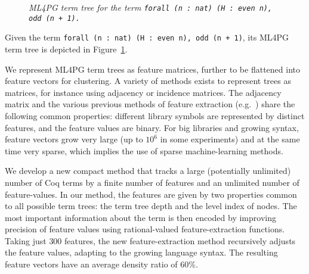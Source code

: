 \begin{figure}[t]
\centering
{}
\caption{\scriptsize{\emph{ML4PG term tree for the term \texttt{forall (n : nat) (H : even n), odd (n + 1).}}}}\label{fig:termtree}
\end{figure}

\begin{example}\label{ex1}
 Given the term \lstinline?forall (n : nat) (H : even n), odd (n + 1)?, its ML4PG term tree is depicted in Figure~\ref{fig:termtree}.
 \end{example}

We represent ML4PG term trees as feature matrices, further to be flattened into feature vectors for clustering.
A variety of methods exists to represent trees as matrices, for instance using
adjacency or incidence matrices. The adjacency matrix and the various previous methods of  feature
extraction (e.g.~\cite{lpar-urban,K13,UrbanSPV08}) share the following common properties: different
library symbols are represented by distinct features, and the
feature values are binary.
For
big libraries and growing syntax, feature vectors grow very large (up to $10^6$ in some experiments)
and at the same time very sparse, which implies the use of sparse machine-learning methods.

We develop a new compact method that tracks a large (potentially unlimited) number of Coq terms by a finite number of features and an unlimited number of feature-values.
In our method, the features are given by two properties common to all possible term trees: the term tree depth and the level index of nodes.
The most important information about the term is then encoded by improving precision of feature values
using rational-valued feature-extraction functions. Taking just $300$ features, the new feature-extraction method recursively adjusts the feature values,
adapting to the growing language syntax.
The resulting feature vectors have an average density ratio of 60\%.

